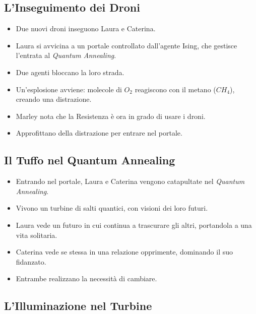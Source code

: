 \subsection*{L'Inseguimento dei Droni}

\begin{itemize}
    \item Due nuovi droni inseguono Laura e Caterina.
    \item Laura si avvicina a un portale controllato dall'agente Ising, che gestisce l'entrata al \emph{Quantum Annealing}.
    \item Due agenti bloccano la loro strada.
    \item Un'esplosione avviene: molecole di \( O_2 \) reagiscono con il metano (\( CH_4 \)), creando una distrazione.
    \item Marley nota che la Resistenza è ora in grado di usare i droni.
    \item Approfittano della distrazione per entrare nel portale.
\end{itemize}

\subsection*{Il Tuffo nel Quantum Annealing}

\begin{itemize}
    \item Entrando nel portale, Laura e Caterina vengono catapultate nel \emph{Quantum Annealing}.
    \item Vivono un turbine di salti quantici, con visioni dei loro futuri.
    \item Laura vede un futuro in cui continua a trascurare gli altri, portandola a una vita solitaria.
    \item Caterina vede se stessa in una relazione opprimente, dominando il suo fidanzato.
    \item Entrambe realizzano la necessità di cambiare.
\end{itemize}

\subsection*{L'Illuminazione nel Turbine}


